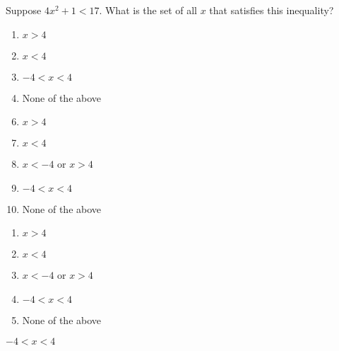 


 Suppose $4x^{2}+1<17.$  What is the set of all $x$ that satisfies this inequality?




\ifsat
	\begin{enumerate}[label=\Alph*)]
		\item   $x>4$
		\item  $x<4$
		\item  $-4<x<4$%
		\item  None of the above
	\end{enumerate}
\else
\fi

\ifacteven
	\begin{enumerate}[label=\textbf{\Alph*.},itemsep=\fill,align=left]
		\setcounter{enumii}{5}
		\item   $x>4$
		\item  $x<4$
		\item  $x<-4$ or $x>4$
		\addtocounter{enumii}{1}
		\item  $-4<x<4$%
		\item  None of the above
	\end{enumerate}
\else
\fi

\ifactodd
	\begin{enumerate}[label=\textbf{\Alph*.},itemsep=\fill,align=left]
		\item   $x>4$
		\item  $x<4$
		\item  $x<-4$ or $x>4$
		\item  $-4<x<4$%
		\item  None of the above
	\end{enumerate}
\else
\fi

\ifgridin
  $-4<x<4$%
		
\else
\fi

